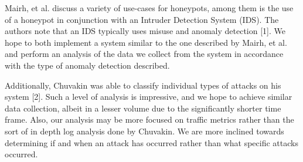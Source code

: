 Mairh, et al. discuss a variety of use-cases for honeypots, among them is the use of a honeypot in conjunction with an Intruder Detection System (IDS). The authors note that an IDS typically uses misuse and anomaly detection [1]. We hope to both implement a system similar to the one described by Mairh, et al. and perform an analysis of the data we collect from the system in accordance with the type of anomaly detection described.

Additionally, Chuvakin was able to classify individual types of attacks on his system [2]. Such a level of analysis is impressive, and we hope to achieve similar data collection, albeit in a lesser volume due to the significantly shorter time frame. Also, our analysis may be more focused on traffic metrics rather than the sort of in depth log analysis done by Chuvakin. We are more inclined towards determining if and when an attack has occurred rather than what specific attacks occurred.